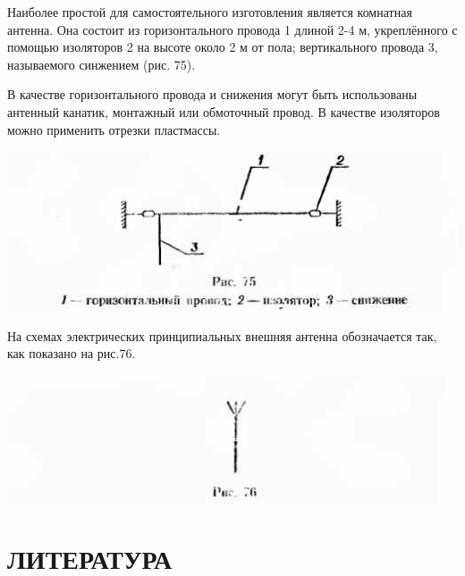 \documentclass[12pt]{article}
\begin{document}
Наиболее простой для самостоятельного изготовления является комнатная антенна. Она состоит из горизонтального провода 1 длиной 2-4 м, укреплённого с помощью изоляторов 2 на высоте около 2 м от пола; вертикального провода 3, называемого синжением (рис. 75).

В качестве горизонтального провода и снижения могут быть использованы антенный канатик, монтажный или обмоточный провод. В качестве изоляторов можно применить отрезки пластмассы.

\includegraphics[scale=1, angle=0]{ekon3_076_1}

На схемах электрических принципиальных внешняя антенна обозначается так, как показано на рис.76.

\includegraphics[scale=1, angle=0]{ekon3_076_2}

\newpage

\section{ЛИТЕРАТУРА}
\end{document}
